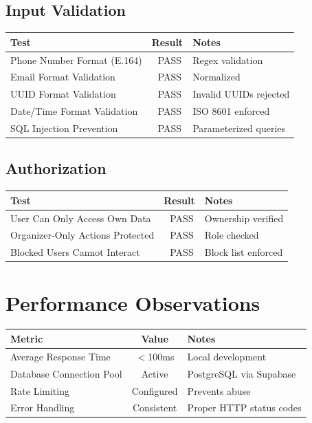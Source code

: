 \documentclass[11pt,a4paper]{article}
\newcommand{\pass}{\textcolor{pass}{\checkmark\ PASS}}
\begin{document}
\subsection{Input Validation}
\begin{tabular}{|p{8cm}|c|p{4cm}|}
\hline
\textbf{Test} & \textbf{Result} & \textbf{Notes} \\
\hline
Phone Number Format (E.164) & \pass & Regex validation \\
\hline
Email Format Validation & \pass & Normalized \\
\hline
UUID Format Validation & \pass & Invalid UUIDs rejected \\
\hline
Date/Time Format Validation & \pass & ISO 8601 enforced \\
\hline
SQL Injection Prevention & \pass & Parameterized queries \\
\hline
\end{tabular}

\subsection{Authorization}
\begin{tabular}{|p{8cm}|c|p{4cm}|}
\hline
\textbf{Test} & \textbf{Result} & \textbf{Notes} \\
\hline
User Can Only Access Own Data & \pass & Ownership verified \\
\hline
Organizer-Only Actions Protected & \pass & Role checked \\
\hline
Blocked Users Cannot Interact & \pass & Block list enforced \\
\hline
\end{tabular}


\section{Performance Observations}

\begin{tabular}{|p{6cm}|c|p{5cm}|}
\hline
\textbf{Metric} & \textbf{Value} & \textbf{Notes} \\
\hline
Average Response Time & $<$100ms & Local development \\
\hline
Database Connection Pool & Active & PostgreSQL via Supabase \\
\hline
Rate Limiting & Configured & Prevents abuse \\
\hline
Error Handling & Consistent & Proper HTTP status codes \\
\hline
\end{tabular}
\end{document}
